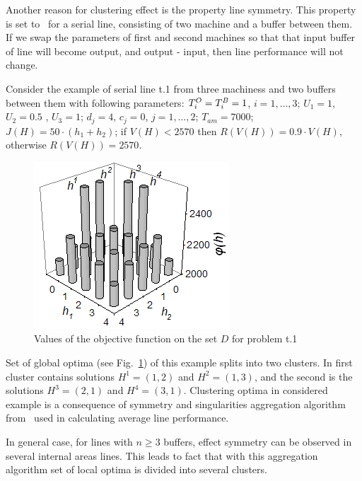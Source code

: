 \documentclass{ifacconf}
\begin{document}
Another reason for clustering effect is the property
line symmetry. This property is set to~\cite{LP} for a serial line,
consisting of two machine and a buffer
between them. If we swap the parameters of first and second machines so that
that input buffer of line will become output, and output - input, then
line performance will not change.

Consider the example of serial line t.1 from
three machiness and two buffers between them with following parameters: ${T^{\rm O}_i=T^{\rm B}_i=1}$, $i = 1,\ldots,3$;
 ${U_1=1}$, ${U_2=0.5}$ , ${U_3=1}$;
 ${d_j=4}$, ${c_j=0}$, $j = 1,\ldots,2$;
 $T_{am}=7000$;
 $J(H)=50\cdot(h_1+h_2)$;
 if $V(H) < 2570$ then $R(V(H))=0.9\cdot V(H)$, otherwise $R(V(H))=2570$.

 \begin{figure}[h!]
	\centering
	\includegraphics[scale=0.9]{test}
  \caption{Values of the objective function on the set $D$ for problem t.1\label{t_1}}
  \end{figure}

Set of global optima (see Fig.~\ref{t_1}) of this example splits into two clusters. In
first cluster contains solutions $H^1=(1,2)$ and $H^2=(1,3)$, and
the second is the solutions $H^3=(2,1)$ and $H^4=(3,1)$. Clustering optima in
considered example is a consequence of symmetry and singularities
aggregation algorithm from~\cite{Dolgui93} used in calculating average
line performance.

In general case, for lines with $n\geq 3$ buffers, effect
symmetry can be observed in several internal areas
lines. This leads to fact that with this aggregation algorithm
set of local optima is divided into several clusters.
\end{document}
